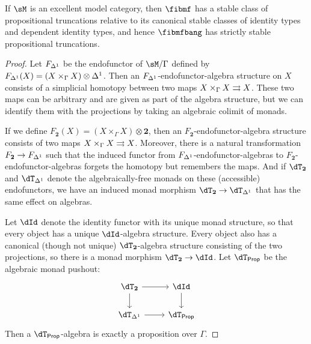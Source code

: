 \documentclass[referee]{psp}
\def\dtprop{\dT_{\mathsf{Prop}}}
\def\tr{\mathsf{tr}}
\def\treq{\mathsf{treq}}
\begin{document}
\begin{thm}
  If $\sM$ is an excellent model category, then $\fibmf$ has a stable class of propositional truncations relative to its canonical stable classes of identity types and dependent identity types, and hence $\fibmfbang$ has strictly stable propositional truncations.
\end{thm}
\begin{proof}
  Let $F_{{\Delta^1}}$ be the endofunctor of $\sM/\Gamma$ defined by $F_{{\Delta^1}}(X) = (X \times_\Gamma X) \otimes {\Delta^1}$.
  Then an $F_{{\Delta^1}}$-endofunctor-algebra structure on $X$ consists of a simplicial homotopy between two maps $X \times_\Gamma X \rightrightarrows X$.
  These two maps can be arbitrary and are given as part of the algebra structure, but we can identify them with the projections by taking an algebraic colimit of monads.

  If we define $F_{\mathbf{2}}(X) = (X\times_\Gamma X) \otimes \mathbf{2}$, then an $F_{\mathbf{2}}$-endofunctor-algebra structure consists of two maps $X \times_\Gamma X \rightrightarrows X$.
  Moreover, there is a natural transformation $F_{\mathbf{2}} \to F_{\Delta^1}$ such that the induced functor from $F_{{\Delta^1}}$-endofunctor-algebras to $F_{\mathbf{2}}$-endofunctor-algebras forgets the homotopy but remembers the maps.
  And if $\dT_{\mathbf{2}}$ and $\dT_\ivl$ denote the algebraically-free monads on these (accessible) endofunctors, we have an induced monad morphism $\dT_{\mathbf{2}} \to \dT_\ivl$ that has the same effect on algebras.

  Let $\dId$ denote the identity functor with its unique monad structure, so that every object has a unique $\dId$-algebra structure.
  Every object also has a canonical (though not unique) $\dT_{\mathbf{2}}$-algebra structure consisting of the two projections, so there is a monad morphism $\dT_{\mathbf{2}} \to \dId$.
  Let $\dtprop$ be the algebraic monad pushout:
  \[
  \begin{tikzcd}
    \dT_{\mathbf{2}} \ar[r] \ar[d] & \dId \ar[d] \\ \dT_{\ivl} \ar[r] & \dtprop
  \end{tikzcd}
  \]
  Then a $\dtprop$-algebra is exactly a proposition over $\Gamma$.


\end{proof}
\end{document}
